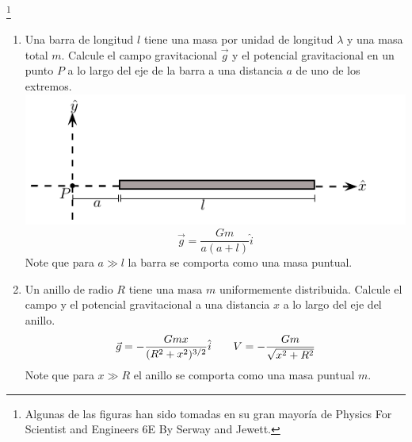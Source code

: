\documentclass[11pt,twocolumn]{article}
\title{}
\author{}
\date{}
\begin{document}
\pagestyle{empty}
\sffamily
{}

\footnote{Algunas de las figuras han sido tomadas en su gran mayoría de Physics For Scientist and Engineers 6E By Serway and Jewett.}

\begin{enumerate}
\item Una barra de longitud $l$ tiene una masa por unidad de longitud $\lambda$ y una masa total $m$. Calcule el campo gravitacional $\vec{g}$ y el potencial gravitacional en un punto $P$ a lo largo del eje de la barra a una distancia $a$ de uno de los extremos.
{
\includegraphics[scale=1.0]{barra}
}
\begin{displaymath}
\vec{g}=\dfrac{G m}{a(a+l)} \hat{i}
\end{displaymath}
\small{Note que para $a\gg l$ la barra se comporta como una masa puntual.} 

\item Un anillo de radio $R$ tiene una masa $m$ uniformemente distribuida. Calcule el campo y el potencial gravitacional a una distancia $x$ a lo largo del eje del anillo.
\begin{displaymath}
\vec{g}=-\dfrac{G m x}{(R^2+x^2)^{3/2}} \hat{i} \hspace{0.7 cm} V=-\dfrac{G m}{\sqrt{x^2 +R^2}}
\end{displaymath}
\small{Note que para $x\gg R$ el anillo se comporta como una masa puntual $m$.} 


\end{enumerate}
\end{document}
